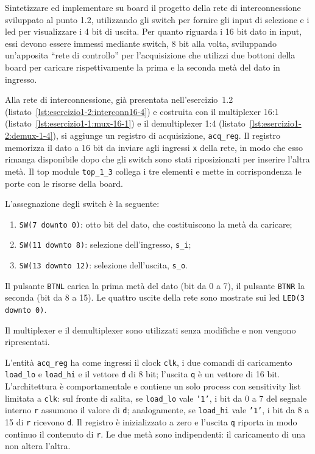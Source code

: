 \label{sec:esercizio1-3}

\begin{traccia}
Sintetizzare ed implementare su board il progetto della rete di interconnessione sviluppato al punto 1.2, utilizzando gli switch per fornire gli input di selezione e i led per visualizzare i 4 bit di uscita. Per quanto riguarda i 16 bit dato in input, essi devono essere immessi mediante switch, 8 bit alla volta, sviluppando un'apposita ``rete di controllo'' per l'acquisizione che utilizzi due bottoni della board per caricare rispettivamente la prima e la seconda metà del dato in ingresso.
\end{traccia}

\progetto

Alla rete di interconnessione, già presentata nell'esercizio~1.2 (listato~\ref{lst:esercizio1-2:interconn16-4}) e costruita con il multiplexer 16:1 (listato~\ref{lst:esercizio1-1:mux-16-1}) e il demultiplexer 1:4 (listato~\ref{lst:esercizio1-2:demux-1-4}), si aggiunge un registro di acquisizione, \texttt{acq\_reg}. Il registro memorizza il dato a 16 bit da inviare agli ingressi \texttt{x} della rete, in modo che esso rimanga disponibile dopo che gli switch sono stati riposizionati per inserire l'altra metà. Il top module \texttt{top\_1\_3} collega i tre elementi e mette in corrispondenza le porte con le risorse della board.

L'assegnazione degli switch è la seguente:
\begin{enumerate}
  \item \texttt{SW(7 downto 0)}: otto bit del dato, che costituiscono la metà da caricare;
  \item \texttt{SW(11 downto 8)}: selezione dell'ingresso, \texttt{s\_i};
  \item \texttt{SW(13 downto 12)}: selezione dell'uscita, \texttt{s\_o}.
\end{enumerate}
Il pulsante \texttt{BTNL} carica la prima metà del dato (bit da 0 a 7), il pulsante \texttt{BTNR} la seconda (bit da 8 a 15). Le quattro uscite della rete sono mostrate sui led \texttt{LED(3 downto 0)}.

Il multiplexer e il demultiplexer sono utilizzati senza modifiche e non vengono ripresentati.

\implementazione

L'entità \texttt{acq\_reg} ha come ingressi il clock \texttt{clk}, i due comandi di caricamento \texttt{load\_lo} e \texttt{load\_hi} e il vettore \texttt{d} di 8 bit; l'uscita \texttt{q} è un vettore di 16 bit. L'architettura è comportamentale e contiene un solo process con sensitivity list limitata a \texttt{clk}: sul fronte di salita, se \texttt{load\_lo} vale \texttt{'1'}, i bit da 0 a 7 del segnale interno \texttt{r} assumono il valore di \texttt{d}; analogamente, se \texttt{load\_hi} vale \texttt{'1'}, i bit da 8 a 15 di \texttt{r} ricevono \texttt{d}. Il registro è inizializzato a zero e l'uscita \texttt{q} riporta in modo continuo il contenuto di \texttt{r}. Le due metà sono indipendenti: il caricamento di una non altera l'altra.

